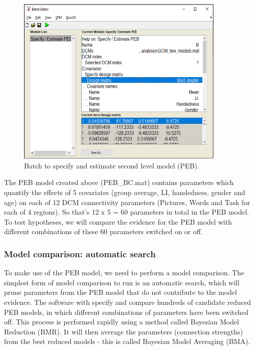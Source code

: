 \documentclass{article}
\begin{document}
\begin{figure}[ht]
\begin{center}
\includegraphics[width=10cm]{"Fig_batch_specify_peb"}
\caption{Batch to specify and estimate second level model (PEB). \label{Fig_batch_specify_peb}}
\end{center}
\end{figure}

The PEB model created above (PEB\_BC.mat) contains parameters which quantify the effects of 5 covariates (group average, LI, handedness, gender and age) on each of 12 DCM connectivity parameters (Pictures, Words and Task for each of 4 regions). So that's 12 x 5 = 60 parameters in total in the PEB model. To test hypotheses, we will compare the evidence for the PEB model with different combinations of these 60 parameters switched on or off.

\subsubsection{Model comparison: automatic search} \label{GUI_search}

To make use of the PEB model, we need to perform a model comparison. The simplest form of model comparison to run is an automatic search, which will prune parameters from the PEB model that do not contribute to the model evidence. The software with specify and compare hundreds of candidate reduced PEB models, in which different combinations of parameters have been switched off. This process is performed rapidly using a method called Bayesian Model Reduction (BMR). It will then average the parameters (connection strengths) from the best reduced models - this is called Bayesian Model Averaging (BMA).
\end{document}
